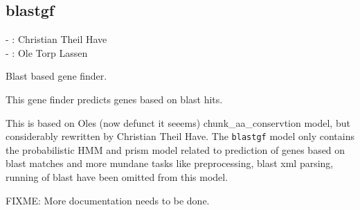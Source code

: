 


\subsection{blastgf}

\label{sec:blastgf}

\begin{tags}
- : Christian Theil Have \\- : Ole Torp Lassen
\end{tags}

Blast based gene finder.

This gene finder predicts genes based on blast hits.

This is based on Oles (now defunct it seeems) chunk_aa_conservtion model, but considerably rewritten by Christian Theil Have.
The \verb$blastgf$ model only contains the probabilistic HMM and prism model related to prediction of
genes based on blast matches and more mundane tasks like preprocessing, blast xml parsing, running of
blast have been omitted from this model.

FIXME: More documentation needs to be done.\vspace{0.7cm}

